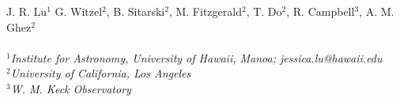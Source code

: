 J. R. Lu${}^1$
G. Witzel${}^2$,
B. Sitarski${}^2$,
M. Fitzgerald${}^2$,
T. Do${}^2$,
R. Campbell${}^3$,
A. M. Ghez${}^2$
\\
\\
${}^1${\em Institute for Astronomy, University of Hawaii, Manoa; jessica.lu@hawaii.edu}
\\
${}^2${\em University of California, Los Angeles}
\\
${}^3${\em W. M. Keck Observatory}

